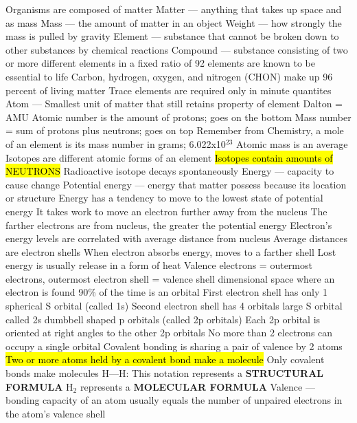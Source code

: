 \documentclass[../main.tex]{subfiles}
\begin{document}
\begin{outline}
	\1 Organisms are composed of matter
	\2 Matter --- anything that takes up space and as mass
	\3 Mass --- the amount of matter in an object
	\3 Weight --- how strongly the mass is pulled by gravity
	\1 Element --- substance that cannot be broken down to other substances by chemical reactions
	\1 Compound --- substance consisting of two or more different elements in a fixed ratio
	 of 92 elements are known to be essential to life
	\2 Carbon, hydrogen, oxygen, and nitrogen (CHON) make up 96 percent of living matter
	\2 Trace elements are required only in minute quantites
	\1 Atom --- Smallest unit of matter that still retains property of element
	\1 Dalton = AMU
	\1 Atomic number is the amount of protons; goes on the bottom
	\1 Mass number = sum of protons plus neutrons; goes on top
	\2 Remember from Chemistry, a mole of an element is its mass number in grams; 6.022x10$^{23}$
	\1 Atomic mass is an average
	\1 Isotopes are different atomic forms of an element
	\2 \hl{Isotopes contain amounts of NEUTRONS}
	\1 Radioactive isotope decays spontaneously
	\1 Energy --- capacity to cause change
	\1 Potential energy --- energy that matter possess because its location or structure
	\2 Energy has a tendency to move to the lowest state of potential energy
	\2 It takes work to move an electron further away from the nucleus
	\2 The farther electrons are from nucleus, the greater the potential energy
	\1 Electron's energy levels are correlated with average distance from nucleus
	\2 Average distances are electron shells
	\2 When electron absorbs energy, moves to a farther shell
	\1 Lost energy is usually release in a form of heat
	\1 Valence electrons = outermost electrons, outermost electron shell = valence shell
	 dimensional space where an electron is found 90\% of the time is an orbital
	\1 First electron shell has only 1 spherical S orbital (called 1s)
	\1 Second electron shell has 4 orbitals
	 large S orbital called 2s
	 dumbbell shaped p orbitals (called 2p orbitals)
	\2 Each 2p orbital is oriented at right angles to the other 2p orbitals
	\1 No more than 2 electrons can occupy a single orbital
	\1 Covalent bonding is sharing a pair of valence by 2 atoms
	\1 \hl{Two or more atoms held by a covalent bond make a molecule}
	\2 Only covalent bonds make molecules
	\1 H---H: This notation represents a \textbf{STRUCTURAL FORMULA}
	\1 H$_2$ represents a \textbf{MOLECULAR FORMULA}
	\1 Valence --- bonding capacity of an atom
	\2 usually equals the number of unpaired electrons in the atom's valence shell

\end{outline}
\end{document}

